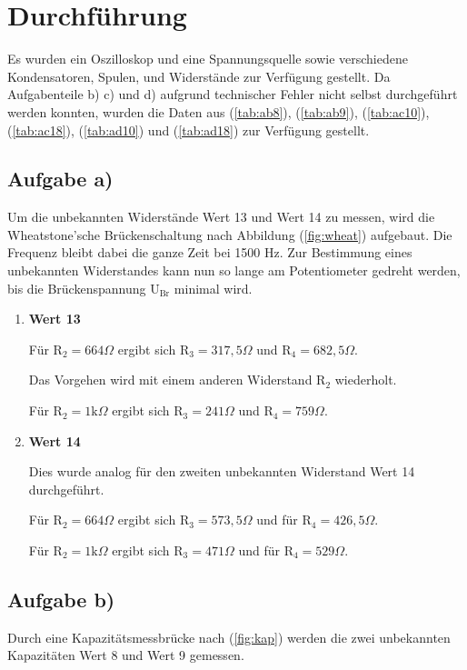 \newpage
\section{Durchführung}
Es wurden ein Oszilloskop und eine Spannungsquelle sowie verschiedene Kondensatoren, Spulen, und Widerstände zur Verfügung gestellt.
Da Aufgabenteile b) c) und d) aufgrund technischer Fehler nicht selbst durchgeführt werden konnten, wurden die Daten aus (\ref{tab:ab8}), (\ref{tab:ab9}), (\ref{tab:ac10}), (\ref{tab:ac18}), (\ref{tab:ad10}) und (\ref{tab:ad18}) zur Verfügung gestellt.

\subsection{Aufgabe a)}
\label{subsec:aa}
Um die unbekannten Widerstände Wert 13 und Wert 14 zu messen, wird die Wheatstone'sche Brückenschaltung nach Abbildung (\ref{fig:wheat}) aufgebaut.
Die Frequenz bleibt dabei die ganze Zeit bei 1500 Hz.
Zur Bestimmung eines unbekannten Widerstandes kann nun so lange am Potentiometer gedreht werden, bis die Brückenspannung $\text{U}_\text{Br}$ minimal wird.

\begin{enumerate}
\item \textbf{Wert 13}

Für $\text{R}_2 = 664 \Omega$ ergibt sich $\text{R}_3 = 317,5 \Omega$ und $\text{R}_4 = 682,5 \Omega$.

Das Vorgehen wird mit einem anderen Widerstand $\text{R}_2$ wiederholt.

Für $\text{R}_2 =1\text{k} \Omega$ ergibt sich $\text{R}_3 = 241 \Omega$ und $\text{R}_4 = 759 \Omega$.

\item \textbf{Wert 14}

Dies wurde analog für den zweiten unbekannten Widerstand Wert 14 durchgeführt.

Für $\text{R}_2 = 664 \Omega$ ergibt sich $\text{R}_3 = 573,5 \Omega$ und für $\text{R}_4 = 426,5 \Omega$.

Für $\text{R}_2 = 1\text{k} \Omega$ ergibt sich $\text{R}_3 = 471 \Omega$ und für $\text{R}_4 = 529 \Omega$.
\end{enumerate}


\subsection{Aufgabe b)}

Durch eine Kapazitätsmessbrücke nach (\ref{fig:kap}) werden die zwei unbekannten Kapazitäten Wert 8 und Wert 9 gemessen.

